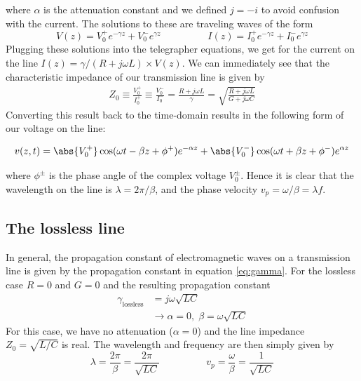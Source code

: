 where $\alpha$ is the attenuation constant and we defined $j=-i$ to avoid confusion with the current.
The solutions to these are traveling waves of the form
\begin{equation}
V(z) = V_0^+e^{-\gamma z} + V_0^-e^{\gamma z} \hspace{2cm} I(z) = I_0^+e^{-\gamma z} + I_0^-e^{\gamma z}
\label{eq:telegraph:solution}
\end{equation}
Plugging these solutions into the telegrapher equations, we get for the current on the line $I(z)=\gamma/(R+j\omega L) \times V(z)$.
We can immediately see that the characteristic impedance of our transmission line is given by
\begin{align}
Z_0 \equiv \frac{V_0^+}{I_0^+}\equiv \frac{V_0^-}{I_0^-}= \frac{R+j\omega L}{\gamma} = \sqrt{\frac{R+j\omega L}{G + j\omega C}}
\end{align}
Converting this result back to the time-domain results in the following form of our voltage on the line:

\begin{align}
v(z,t) = \abs{V_0^+}\cos(\omega t-\beta z+\phi^+)e^{-\alpha z} + \abs{V_0^-}\cos(\omega t+\beta z+\phi^-)e^{\alpha z}
\end{align}

where $\phi^{\pm}$ is the phase angle of the complex voltage $V_0^{\pm}$.
Hence it is clear that the wavelength on the line is $\lambda=2\pi/\beta$, and the phase velocity $v_p=\omega/\beta=\lambda f$.
\subsection{The lossless line}
In general, the propagation constant of electromagnetic waves on a transmission line is given by the propagation constant in equation \ref{eq:gamma}.
For the lossless case $R=0$ and $G=0$ and the resulting propagation constant
\begin{align}
\gamma_\mathrm{lossless} &= j\omega\sqrt{LC} \\%
&\rightarrow \alpha=0, \; \beta=\omega\sqrt{LC}
\end{align}
For this case, we have no attenuation ($\alpha=0$) and the line impedance $Z_0=\sqrt{L/C}$ is real.
The wavelength and frequency are then simply given by
\begin{equation}
\lambda = \frac{2\pi}{\beta} = \frac{2\pi}{\sqrt{LC}} \hspace{2cm} v_p=\frac{\omega}{\beta}=\frac{1}{\sqrt{LC}}
\end{equation}

